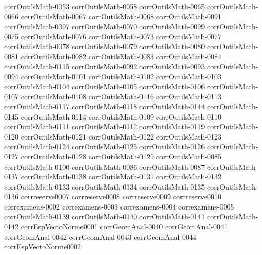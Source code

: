 {corrOutilsMath-0053}
{corrOutilsMath-0058}
{corrOutilsMath-0065}
{corrOutilsMath-0066}
{corrOutilsMath-0067}
{corrOutilsMath-0068}
{corrOutilsMath-0091}
{corrOutilsMath-0097}
{corrOutilsMath-0070}
{corrOutilsMath-0099}
{corrOutilsMath-0075}
{corrOutilsMath-0076}
{corrOutilsMath-0073}
{corrOutilsMath-0077}
{corrOutilsMath-0078}
{corrOutilsMath-0079}
{corrOutilsMath-0080}
{corrOutilsMath-0081}
{corrOutilsMath-0082}
{corrOutilsMath-0083}
{corrOutilsMath-0084}
{corrOutilsMath-0115}
{corrOutilsMath-0092}
{corrOutilsMath-0093}
{corrOutilsMath-0094}
{corrOutilsMath-0101}
{corrOutilsMath-0102}
{corrOutilsMath-0103}
{corrOutilsMath-0104}
{corrOutilsMath-0105}
{corrOutilsMath-0106}
{corrOutilsMath-0107}
{corrOutilsMath-0108}
{corrOutilsMath-0116}
{corrOutilsMath-0113}
{corrOutilsMath-0117}
{corrOutilsMath-0118}
{corrOutilsMath-0144}
{corrOutilsMath-0145}
{corrOutilsMath-0114}
{corrOutilsMath-0109}
{corrOutilsMath-0110}
{corrOutilsMath-0111}
{corrOutilsMath-0112}
{corrOutilsMath-0119}
{corrOutilsMath-0120}
{corrOutilsMath-0121}
{corrOutilsMath-0122}
{corrOutilsMath-0123}
{corrOutilsMath-0124}
{corrOutilsMath-0125}
{corrOutilsMath-0126}
{corrOutilsMath-0127}
{corrOutilsMath-0128}
{corrOutilsMath-0129}
{corrOutilsMath-0085}
{corrOutilsMath-0100}
{corrOutilsMath-0086}
{corrOutilsMath-0087}
{corrOutilsMath-0137}
{corrOutilsMath-0138}
{corrOutilsMath-0131}
{corrOutilsMath-0132}
{corrOutilsMath-0133}
{corrOutilsMath-0134}
{corrOutilsMath-0135}
{corrOutilsMath-0136}
{corrreserve0007}
{corrreserve0008}
{corrreserve0009}
{corrreserve0010}
{correxamens-0002}
{correxamens-0003}
{correxamens-0004}
{correxamens-0005}
{corrOutilsMath-0139}
{corrOutilsMath-0140}
{corrOutilsMath-0141}
{corrOutilsMath-0142}
{corrEspVectoNorme0001}
{corrGeomAnal-0040}
{corrGeomAnal-0041}
{corrGeomAnal-0042}
{corrGeomAnal-0043}
{corrGeomAnal-0044}
{corrEspVectoNorme0002}
